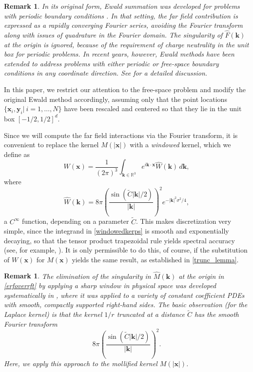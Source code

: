 \documentclass[final,letterpaper]{siamart171218}
\newtheorem{remark}[theorem]{Remark}
\newcommand{\be}{\begin{equation}}
\newcommand{\ee}{\end{equation}}
\newcommand{\x}{\boldsymbol{x}}
\newcommand{\y}{\boldsymbol{y}}
\newcommand{\bk}{\boldsymbol{k}}
\begin{document}
\begin{remark}
In its original form, Ewald summation was 
developed for problems with periodic boundary conditions
\cite{darden1993jcp,ewald1921ap,HE-1981}.
In that setting, the far field contribution is expressed as a 
rapidly converging Fourier series, avoiding the Fourier transform 
along with issues of quadrature in the Fourier domain.
The singularity of $\widehat{F}(\bk)$ at the origin is ignored, because of 
the requirement of charge neutrality in the unit box for periodic problems. 
In recent years, however, Ewald methods have been extended 
to address problems with either periodic or free-space boundary conditions
in any coordinate direction.
See \cite{bagge2022,klinteberg2017,shamshirgar2021jcp} for a detailed discussion.
\end{remark}

In this paper, we restrict our attention to
the free-space problem and modify the original
Ewald method accordingly, assuming only that
the point locations $\{ \x_i, \y_i | \ i=1,\ldots,N \}$  have been 
rescaled and centered so that they lie 
in the unit box $[-1/2,1/2]^d$.

Since we will compute the far field interactions via the Fourier transform,
it is convenient to replace the 
kernel $M(|\x|)$ with a {\em windowed} kernel, which we define as
\be
\label{windowedkerps}
W(\x)=\frac{1}{(2\pi)^3} \int_{\bk \in \mathbb{R}^3} 
e^{i\bk\cdot \x} \widehat{W}(\bk) \, d\bk, 
\ee
where
\be\label{windowedkernelft}
\widehat{W}(\bk) = 
8\pi \left(\frac{\sin(\tilde{C}|\bk|/2)}{|\bk|}\right)^2 e^{-|\bk|^2\sigma^2/4},
\ee
a $C^{\infty}$ function, depending on a parameter $\tilde{C}$.
This makes discretization very simple, since the 
integrand in \eqref{windowedkerps} is
smooth and exponentially decaying, so that the tensor
product trapezoidal rule yields spectral accuracy 
(see, for example, \cite{trefethentrap}). It is only permissible to do this,
of course, if the substitution of $W(\x)$ for $M(\x)$ yields the same result,
as established in \cref{trunc_lemma}. 

\begin{remark} \label{vicoremark}
The elimination of the singularity in 
$\widehat{M}(\bk)$ at the origin in \cref{erfoverrft} by 
applying a sharp window in physical space was developed systematically in
\cite{vico2016jcp}, where it was applied to a variety of constant coefficient PDEs
with smooth, compactly supported right-hand sides. The basic observation (for the 
Laplace kernel) is that the kernel $1/r$ truncated at a distance $\tilde{C}$
has the smooth Fourier transform
\[
8 \pi \left(\frac{\sin(\tilde{C}|\bk|/2)}{|\bk|}\right)^2 .
\]
Here, we apply this approach to the mollified kernel $M(|\x|)$.
\end{remark}
\end{document}
